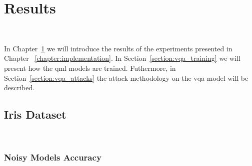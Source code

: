 \chapter{Results}\label{chapter:results} \

In Chapter~\ref{chapter:results} we will introduce
the results of the experiments presented in Chapter
~\ref{chapter:implementation}. In Section~\ref{section:vqa_training}
we will present how the \ac{qml} models are trained.
Futhermore, in Section~\ref{section:vqa_attacks} the
attack methodology on the \ac{vqa} model will be described. \

\section{Iris Dataset}\label{section:iris-eval} \

\subsection{Noisy Models Accuracy}\label{subsection:iris-noisy-acc} \

